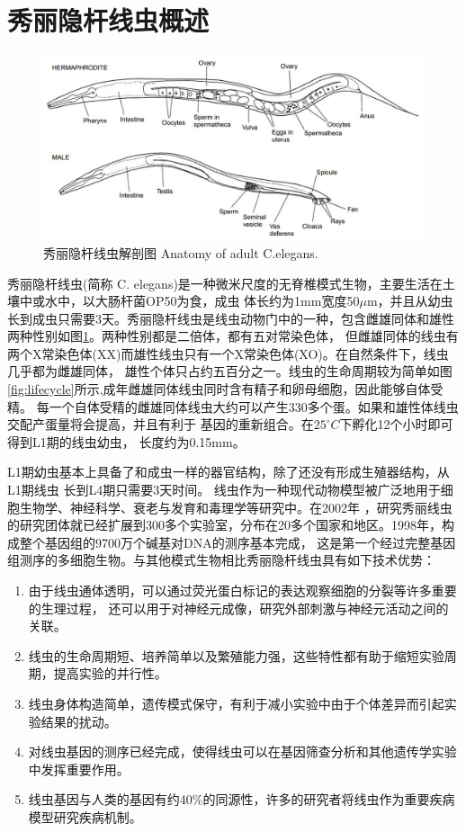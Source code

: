 \section{秀丽隐杆线虫概述}
	\begin{figure}[h]
	  \centering
	  \includegraphics[width=14cm]{figure/chap1/Celegans.jpg}
	  \bicaption
		{秀丽隐杆线虫解剖图}
		{Anatomy of adult C.elegans.}
	  \label{fig:Celegans}
	\end{figure}
	秀丽隐杆线虫(简称 C. elegans)是一种微米尺度的无脊椎模式生物，主要生活在土壤中或水中，以大肠杆菌OP50为食，成虫
	体长约为1mm宽度50$\mu$m，并且从幼虫长到成虫只需要3天。秀丽隐杆线虫是线虫动物门中的一种，包含雌雄同体和雄性两种性别如图\ref{fig:Celegans}。两种性别都是二倍体，都有五对常染色体，
	但雌雄同体的线虫有两个X常染色体(XX)而雄性线虫只有一个X常染色体(XO)。在自然条件下，线虫几乎都为雌雄同体，
	雄性个体只占约五百分之一。线虫的生命周期较为简单如图\ref{fig:lifecycle}所示,成年雌雄同体线虫同时含有精子和卵母细胞，因此能够自体受精。
	每一个自体受精的雌雄同体线虫大约可以产生330多个蛋。如果和雄性体线虫交配产蛋量将会提高，并且有利于
	基因的重新组合。在$25^\circ C$下孵化12个小时即可得到L1期的线虫幼虫，
	长度约为0.15mm。
	
	L1期幼虫基本上具备了和成虫一样的器官结构，除了还没有形成生殖器结构，从L1期线虫
	长到L4期只需要3天时间。
	线虫作为一种现代动物模型被广泛地用于细胞生物学、神经科学、衰老与发育和毒理学等研究中。在2002年
	，研究秀丽线虫的研究团体就已经扩展到300多个实验室，分布在20多个国家和地区。1998年，构成整个基因组的9700万个碱基对DNA的测序基本完成，
	这是第一个经过完整基因组测序的多细胞生物。与其他模式生物相比秀丽隐杆线虫具有如下技术优势：
	
	\begin{enumerate}[label={\arabic*)},font={\color{black!50!black}\bfseries}]
	  \item 由于线虫通体透明，可以通过荧光蛋白标记的表达观察细胞的分裂等许多重要的生理过程，
	  还可以用于对神经元成像，研究外部刺激与神经元活动之间的关联。
	  \item 线虫的生命周期短、培养简单以及繁殖能力强，这些特性都有助于缩短实验周期，提高实验的并行性。
	  \item 线虫身体构造简单，遗传模式保守，有利于减小实验中由于个体差异而引起实验结果的扰动。
	  \item 对线虫基因的测序已经完成，使得线虫可以在基因筛查分析和其他遗传学实验中发挥重要作用。
	  \item 线虫基因与人类的基因有约40\%的同源性，许多的研究者将线虫作为重要疾病模型研究疾病机制。
	\end{enumerate}
	

